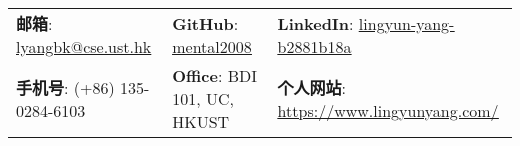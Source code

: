 \documentclass[letterpaper, 10pt]{article}
\begin{document}
\noindent{\huge{杨凌云}
\newdateformat{mydate}{\THEYEAR 年 \THEMONTH 月 \THEDAY 日}
}


\setlength{\tabcolsep}{4pt}


\vspace{0.5cm}
\begin{center}
\begin{tabular}{lll}
\textbf{邮箱}: \underline{lyangbk@cse.ust.hk} &
\hspace{0.30in} \textbf{GitHub}: \href{https://github.com/mental2008}{\underline{mental2008}} &
\hspace{0.1in} \textbf{LinkedIn}: \href{https://www.linkedin.com/in/lingyun-yang-b2881b18a/}{\underline{lingyun-yang-b2881b18a}} \\

\textbf{手机号}: (+86) 135-0284-6103 &
\hspace{0.30in} \textbf{Office}: BDI 101, UC, HKUST &
\hspace{0.1in} \textbf{个人网站}: \href{https://www.lingyunyang.com}{\underline{https://www.lingyunyang.com/}} \\
\end{tabular}
\end{center}
\end{document}
